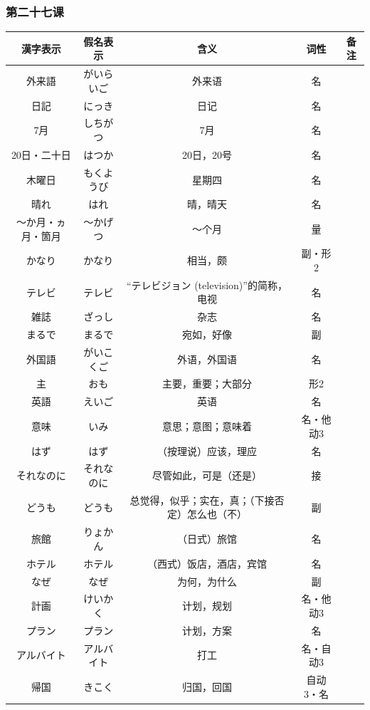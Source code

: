 \subsubsection{第二十七课}
\begin{longtable}{|c|c|c|c|c|}
    \hline
漢字表示 & 假名表示  & 含义 & 词性 & 备注 \\ \hline\hline
外来語 & がいらいご & 外来语 & 名 &  \\ \hline
日記 & にっき & 日记 & 名 &  \\ \hline
7月 & しちがつ & 7月 & 名 &  \\ \hline
20日・二十日 & はつか & 20日，20号 & 名 &  \\ \hline
木曜日 & もくようび & 星期四 & 名 &  \\ \hline
晴れ & はれ & 晴，晴天 & 名 &  \\ \hline
〜か月・ヵ月・箇月 & 〜かげつ & 〜个月 & 量 &  \\ \hline
かなり & かなり & 相当，颇 & 副・形2 &  \\ \hline
テレビ & テレビ & “テレビジョン (television)”的简称，电视 & 名 &  \\ \hline
雑誌 & ざっし & 杂志 & 名 &  \\ \hline
まるで & まるで & 宛如，好像 & 副 &  \\ \hline
外国語 & がいこくご & 外语，外国语 & 名 &  \\ \hline
主 & おも & 主要，重要；大部分 & 形2 &  \\ \hline
英語 & えいご & 英语 & 名 &  \\ \hline
意味 & いみ & 意思；意图；意味着 & 名・他动3 &  \\ \hline
はず & はず & （按理说）应该，理应 & 名 &  \\ \hline
それなのに & それなのに & 尽管如此，可是（还是） & 接 &  \\ \hline
どうも & どうも & 总觉得，似乎；实在，真；（下接否定）怎么也（不） & 副 &  \\ \hline
旅館 & りょかん & （日式）旅馆 & 名 &  \\ \hline
ホテル & ホテル & （西式）饭店，酒店，宾馆 & 名 &  \\ \hline
なぜ & なぜ & 为何，为什么 & 副 &  \\ \hline
計画 & けいかく & 计划，规划 & 名・他动3 &  \\ \hline
プラン & プラン & 计划，方案 & 名 &  \\ \hline
アルバイト & アルバイト & 打工 & 名・自动3 &  \\ \hline
帰国 & きこく & 归国，回国 & 自动3・名 &  \\ \hline

\end{longtable}
